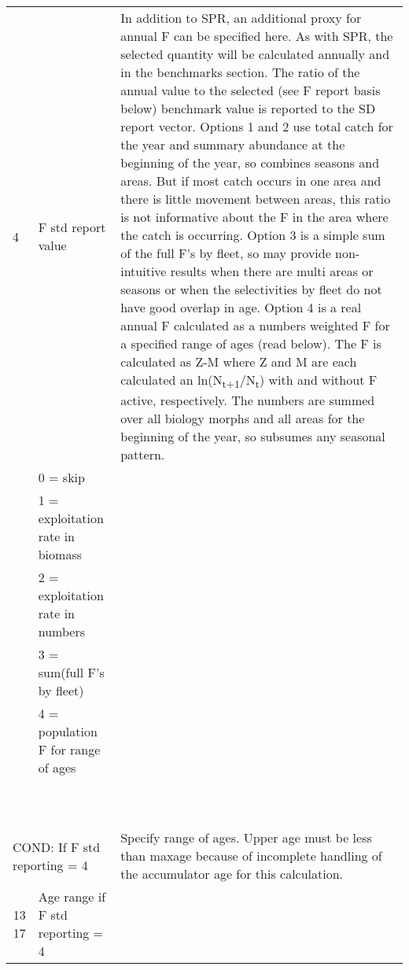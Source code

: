 \begin{landscape}
\begin{longtable}{p{1.5cm} p{7cm} p{12.5cm}}
 \pagebreak
 4 & F std report value &  \multirow{1}{1cm}[-0.1cm]{\parbox{12.5cm}{In addition to SPR, an additional proxy for annual F can be specified here.  As with SPR, the selected quantity will be calculated annually and in the benchmarks section.  The ratio of the annual value to the selected (see F report basis below) benchmark value is reported to the SD report vector.  Options 1 and 2 use total catch for the year and summary abundance at the beginning of the year, so combines seasons and areas.  But if most catch occurs in one area and there is little movement between areas, this ratio is not informative about the F in the area where the catch is occurring.  Option 3 is a simple sum of the full F’s by fleet, so may provide non-intuitive results when there are multi areas or seasons or when the selectivities by fleet do not have good overlap in age.  Option 4 is a real annual F calculated as a numbers weighted F for a specified range of ages (read below).  The F is calculated as Z-M where Z and M are each calculated an ln(N\textsubscript{t+1}/N\textsubscript{t}) with and without F active, respectively. The numbers are summed over all biology morphs and all areas for the beginning of the year, so subsumes any seasonal pattern.}}\\
   & 0 = skip & \\
   & 1 = exploitation rate in biomass & \\
   & 2 = exploitation rate in numbers & \\
   & 3 = sum(full F's by fleet) & \\
   & 4 = population F for range of ages & \\
   & & \\
   & & \\
   & & \\
   & & \\
   & & \\
   & & \\
   & & \\  
   & & \\
   & & \\
   & & \\  
  
 \multicolumn{2}{l}{COND: If F std reporting = 4 } & \multirow{1}{1cm}[-0.1cm]{\parbox{12.5cm}{Specify range of ages. Upper age must be less than maxage because of incomplete handling of the accumulator age for this calculation.}} \\

 \multicolumn{1}{r}{13 17}  & Age range if F std reporting = 4 & \\


\end{longtable}
\end{landscape}
